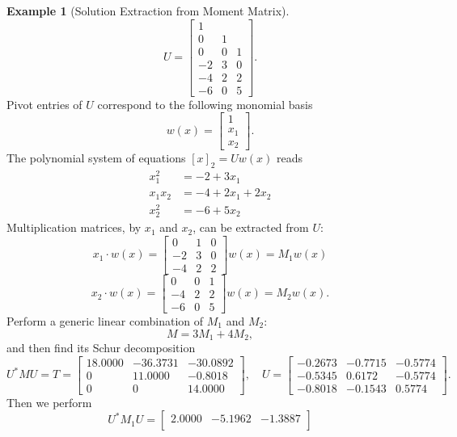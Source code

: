 \documentclass[
]{book}
\theoremstyle{definition}
\theoremstyle{definition}
\newtheorem{example}{Example}[chapter]
\theoremstyle{definition}
\theoremstyle{definition}
\theoremstyle{remark}
\begin{document}
\begin{example}[Solution Extraction from Moment Matrix]
\[
U = \begin{bmatrix}
1 & & \\
0 & 1 & \\
0 & 0 & 1 \\
-2 & 3 & 0 \\
-4 & 2 & 2 \\
-6 & 0 & 5 
\end{bmatrix}.
\]
Pivot entries of \(U\) correspond to the following monomial basis
\[
w(x) = \begin{bmatrix} 1\\ x_1 \\ x_2 \end{bmatrix}.
\]
The polynomial system of equations \([x]_2 = U w(x)\) reads
\begin{equation}
\begin{split}
x_1^2 &= -2 + 3x_1 \\
x_1 x_2 &= -4 + 2x_1 + 2x_2 \\
x_2^2 &= -6 + 5x_2
\end{split}
\end{equation}
Multiplication matrices, by \(x_1\) and \(x_2\), can be extracted from \(U\):
\[
x_1 \cdot w(x) = \begin{bmatrix}
0 & 1 & 0 \\
-2 & 3 & 0 \\
-4 & 2 & 2
\end{bmatrix} w(x) = M_1 w(x)
\]
\[
x_2 \cdot w(x) = \begin{bmatrix}
0 & 0 & 1 \\
-4 & 2 & 2\\
-6 & 0 & 5
\end{bmatrix} w(x) = M_2 w(x).
\]
Perform a generic linear combination of \(M_1\) and \(M_2\):
\[
M = 3 M_1 + 4 M_2,
\]
and then find its Schur decomposition
\[
U^* M U = T = \begin{bmatrix}
18.0000  & -36.3731  & -30.0892\\
0   & 11.0000   & -0.8018 \\
0         & 0   & 14.0000
\end{bmatrix}, \quad U = \begin{bmatrix}
-0.2673   & -0.7715   & -0.5774\\
-0.5345    & 0.6172   & -0.5774\\
-0.8018   &-0.1543    & 0.5774
\end{bmatrix}.
\]
Then we perform
\[
U^* M_1 U = \begin{bmatrix}
2.0000  &  -5.1962   & -1.3887 \\

\end{bmatrix}\]
\end{example}
\end{document}
